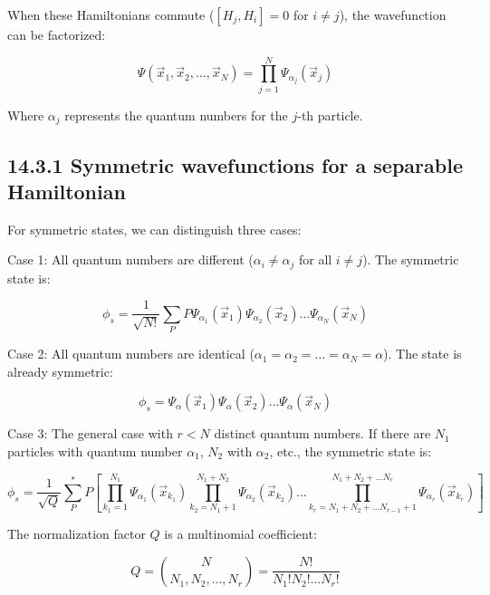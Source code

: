 \documentclass[10pt]{article}
\begin{document}
When these Hamiltonians commute ($[H_j,H_i]=0$ for $i\neq j$), the wavefunction can be factorized:

\begin{equation*}
\Psi(\vec{x}_1,\vec{x}_2,\ldots,\vec{x}_N)=\prod_{j=1}^{N}\Psi_{\alpha_j}(\vec{x}_j) \tag{14.20}
\end{equation*}

Where $\alpha_j$ represents the quantum numbers for the $j$-th particle.

\subsection*{14.3.1 Symmetric wavefunctions for a separable Hamiltonian}
For symmetric states, we can distinguish three cases:

Case 1: All quantum numbers are different ($\alpha_i\neq\alpha_j$ for all $i\neq j$). The symmetric state is:

\begin{equation*}
\phi_s=\frac{1}{\sqrt{N!}}\sum_P P\Psi_{\alpha_1}(\vec{x}_1)\Psi_{\alpha_2}(\vec{x}_2)\ldots\Psi_{\alpha_N}(\vec{x}_N) \tag{14.21}
\end{equation*}

Case 2: All quantum numbers are identical ($\alpha_1=\alpha_2=\ldots=\alpha_N=\alpha$). The state is already symmetric:

\begin{equation*}
\phi_s=\Psi_{\alpha}(\vec{x}_1)\Psi_{\alpha}(\vec{x}_2)\ldots\Psi_{\alpha}(\vec{x}_N) \tag{14.22}
\end{equation*}

Case 3: The general case with $r<N$ distinct quantum numbers. If there are $N_1$ particles with quantum number $\alpha_1$, $N_2$ with $\alpha_2$, etc., the symmetric state is:

\begin{equation*}
\phi_s=\frac{1}{\sqrt{Q}}\sum_P^* P\left[\prod_{k_1=1}^{N_1}\Psi_{\alpha_1}(\vec{x}_{k_1})\prod_{k_2=N_1+1}^{N_1+N_2}\Psi_{\alpha_2}(\vec{x}_{k_2})\ldots\prod_{k_r=N_1+N_2+\ldots N_{r-1}+1}^{N_1+N_2+\ldots N_r}\Psi_{\alpha_r}(\vec{x}_{k_r})\right] \tag{14.23}
\end{equation*}

The normalization factor $Q$ is a multinomial coefficient:

\begin{equation*}
Q=\binom{N}{N_1,N_2,\ldots,N_r}=\frac{N!}{N_1!N_2!\ldots N_r!} \tag{14.24}
\end{equation*}
\end{document}
